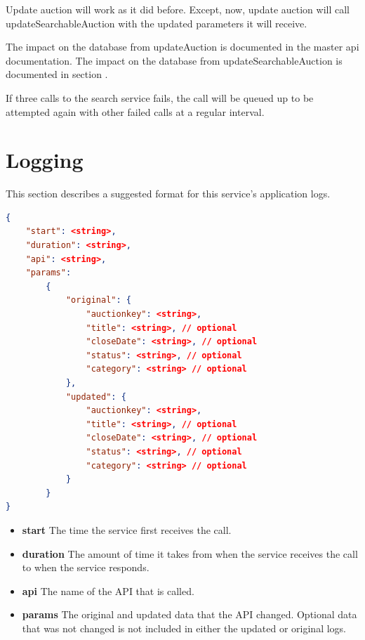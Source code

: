 \documentclass[12pt,a4paper]{article}
\begin{document}
Update auction will work as it did before. Except, now, update auction will
call updateSearchableAuction with the updated parameters it will receive.

The impact on the database from updateAuction is documented in the master api
documentation. The impact on the database from updateSearchableAuction is
documented in section .

If three calls to the search service fails, the call will be queued up to be
attempted again with other failed calls at a regular interval.

\pagebreak
\section{Logging}

This section describes a suggested format for this service's application logs.

\begin{lstlisting}[boxpos=t,language=json,firstnumber=1]
{
    "start": <string>,
    "duration": <string>,
    "api": <string>,
    "params":
        {
            "original": {
                "auctionkey": <string>,
                "title": <string>, // optional
                "closeDate": <string>, // optional
                "status": <string>, // optional
                "category": <string> // optional 
            }, 
            "updated": {
                "auctionkey": <string>,
                "title": <string>, // optional
                "closeDate": <string>, // optional
                "status": <string>, // optional
                "category": <string> // optional 
            }
        }
}           
\end{lstlisting}

\begin{itemize}
    \item \textbf{start} The time the service first receives the call.
    \item \textbf{duration} The amount of time it takes from when the service
        receives the call to when the service responds.
    \item \textbf{api} The name of the API that is called.
    \item \textbf{params} The original and updated data that the API changed.
        Optional data that was not changed is not included in either the
        updated or original logs.
\end{itemize}
\end{document}
